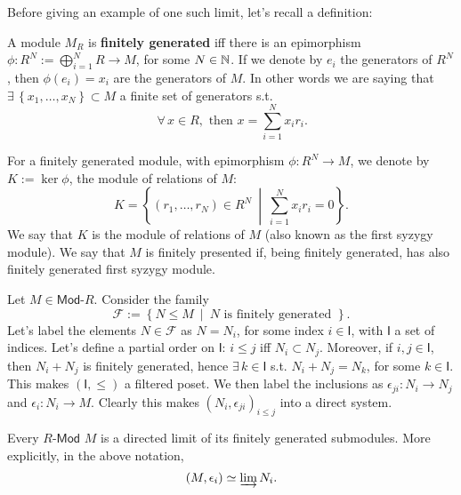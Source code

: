 Before giving an example of one such limit, let's recall a definition:
\begin{defn}
	A module $M_R$ is \textbf{finitely generated} iff there is an epimorphism
	$\phi: R^N := \bigoplus_{i=1}^N R \to M$, for some $N \in \mathbb{N}$.
	If we denote by $e_i$ the generators of $R^N$, then $\phi(e_i) = x_i$ are the generators of $M$.
	In other words we are saying that $\exists\, \left\{ x_1, \ldots, x_N \right\} \subset M$ a finite set of generators 
	s.t.
	\begin{equation}
	\,\forall\,  x \in R, \text{ then } x = \sum_{i=1}^{N} x_i r_i
	.\end{equation} 
\end{defn}

\begin{defn}
	For a finitely generated module, with epimorphism $\phi: R^N \to M$,
	we denote by $K := \ker \phi$, the module of relations of $M$:
	\begin{equation}
	K = 
	\left\{ \left( r_1, \ldots, r_N \right) \in R^N \ \middle|\ \sum_{i=1}^{N} x_i r_i = 0 \right\}
	.\end{equation} 
	We say that $K$ is the module of relations of $M$ (also known as the first syzygy module).
	We say that $M$ is finitely presented if, being finitely generated, has also finitely generated first syzygy module.
\end{defn}

\begin{ex}
	Let $M \in \mathsf{Mod}\text{-}R$.
	Consider the family
	\begin{equation}
	\mathcal{F} := \left\{ N \leq M \ \middle|\ 
	N \text{ is finitely generated } \right\}
	.\end{equation} 
	Let's label the elements $N \in \mathcal{F}$ as $N= N_i$, for some index $i \in \mathsf{I}$, with $\mathsf{I}$ a set of indices.
	Let's define a partial order on $\mathsf{I}$:
	$i \leq j$ iff $N_i \subset N_j$.
	Moreover, if $i, j \in \mathsf{I}$, then $N_i + N_j$ is finitely generated, hence $\exists\, k \in \mathsf{I}$ s.t.
	$N_i + N_j = N_k$, for some $k \in \mathsf{I}$.
	This makes $\left( \mathsf{I}, \leq \right)$ a filtered poset.
	We then label the inclusions as $\epsilon_{ji}: N_i \to N_j$ and $\epsilon_i: N_i \to M$.
	Clearly this makes $\left(N_i, \epsilon_{ji}\right)_{i \leq j}$ into a direct system.
\end{ex} 

\begin{prop}
	Every $R\text{-}\mathsf{Mod}$ $M$ is a directed limit of its finitely generated submodules.
	More explicitly, in the above notation,
	\begin{equation}
	\left(M, \epsilon_i\right) \simeq \varinjlim N_i
	.\end{equation} 
\end{prop} 

